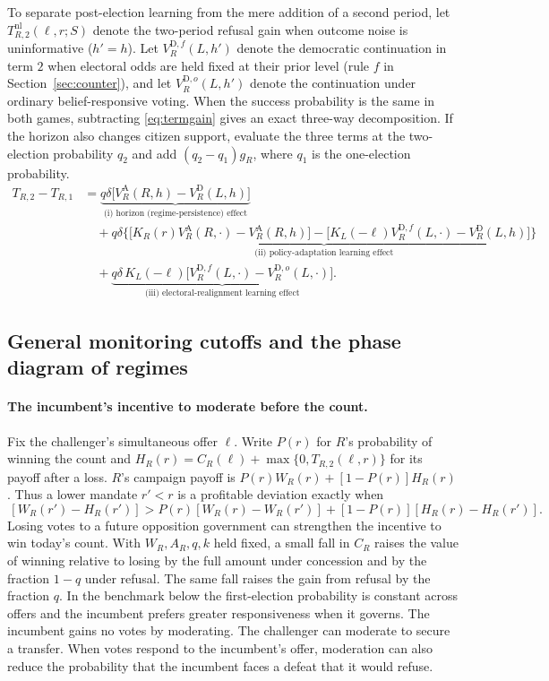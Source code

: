 \documentclass[11pt,letterpaper]{article}
\newcommand{\D}{\mathrm D}
\newcommand{\A}{\mathrm A}
\begin{document}
To separate post-election learning from the mere addition of a second period, let $T_{R,2}^{\mathrm{nl}}(\ell,r;S)$ denote the two-period refusal gain when outcome noise is uninformative ($h'=h$). Let $V_R^{\D,f}(L,h')$ denote the democratic continuation in term $2$ when electoral odds are held fixed at their prior level (rule $f$ in Section~\ref{sec:counter}), and let $V_R^{\D,o}(L,h')$ denote the continuation under ordinary belief-responsive voting. When the success probability is the same in both games, subtracting \eqref{eq:termgain} gives an exact three-way decomposition. If the horizon also changes citizen support, evaluate the three terms at the two-election probability $q_2$ and add $(q_2-q_1)g_R$, where $q_1$ is the one-election probability.
\begin{align}
 T_{R,2}-T_{R,1}
 &=\underbrace{q\delta\big[V_R^\A(R,h)-V_R^\D(L,h)\big]}_{\text{(i) horizon (regime-persistence) effect}}\nonumber\\
 &\quad+\underbrace{q\delta\Big\{\big[K_R(r)V_R^\A(R,\cdot)-V_R^\A(R,h)\big]-\big[K_L(-\ell)V_R^{\D,f}(L,\cdot)-V_R^\D(L,h)\big]\Big\}}_{\text{(ii) policy-adaptation learning effect}}\nonumber\\
 &\quad+\underbrace{q\delta\,K_L(-\ell)\big[V_R^{\D,f}(L,\cdot)-V_R^{\D,o}(L,\cdot)\big]}_{\text{(iii) electoral-realignment learning effect}}.
 \label{eq:threedecomp}
\end{align}

\subsection{General monitoring cutoffs and the phase diagram of regimes}

\paragraph{The incumbent's incentive to moderate before the count.}
Fix the challenger's simultaneous offer $\ell$. Write $P(r)$ for $R$'s probability of winning the count and $H_R(r)=C_R(\ell)+\max\{0,T_{R,2}(\ell,r)\}$ for its payoff after a loss. $R$'s campaign payoff is $P(r)W_R(r)+[1-P(r)]H_R(r)$. Thus a lower mandate $r'<r$ is a profitable deviation exactly when
\begin{equation}
 [P(r')-P(r)]\,[W_R(r')-H_R(r')]
 >P(r)[W_R(r)-W_R(r')]+[1-P(r)][H_R(r)-H_R(r')] .
 \label{eq:incmoderate}
\end{equation}
Losing votes to a future opposition government can strengthen the incentive to win today's count. With $W_R,A_R,q,k$ held fixed, a small fall in $C_R$ raises the value of winning relative to losing by the full amount under concession and by the fraction $1-q$ under refusal. The same fall raises the gain from refusal by the fraction $q$. In the benchmark below the first-election probability is constant across offers and the incumbent prefers greater responsiveness when it governs. The incumbent gains no votes by moderating. The challenger can moderate to secure a transfer. When votes respond to the incumbent's offer, moderation can also reduce the probability that the incumbent faces a defeat that it would refuse.
\end{document}
